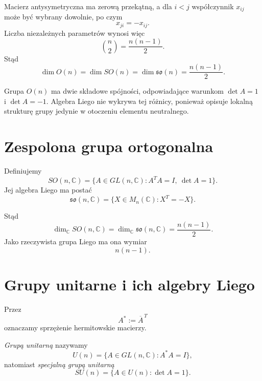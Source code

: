 Macierz antysymetryczna ma zerową przekątną, a dla $i<j$
współczynnik $x_{ij}$ może być wybrany dowolnie, po czym
\[
x_{ji}=-x_{ij}.
\]
Liczba niezależnych parametrów wynosi więc
\[
\binom n2=\frac{n(n-1)}2.
\]
Stąd
\[
\boxed{
\dim O(n)
=
\dim SO(n)
=
\dim\mathfrak{so}(n)
=
\frac{n(n-1)}2.
}
\]

Grupa $O(n)$ ma dwie składowe spójności, odpowiadające warunkom
$\det A=1$ i $\det A=-1$. Algebra Liego nie wykrywa tej różnicy,
ponieważ opisuje lokalną strukturę grupy jedynie w otoczeniu
elementu neutralnego.



\section{Zespolona grupa ortogonalna}


Definiujemy
\[
SO(n,\mathbb C)
=
\{A\in GL(n,\mathbb C):
A^TA=I,\ \det A=1\}.
\]
Jej algebra Liego ma postać
\[
\mathfrak{so}(n,\mathbb C)
=
\{X\in M_n(\mathbb C):X^T=-X\}.
\]

Stąd
\[
\boxed{
\dim_{\mathbb C}SO(n,\mathbb C)
=
\dim_{\mathbb C}\mathfrak{so}(n,\mathbb C)
=
\frac{n(n-1)}2.
}
\]
Jako rzeczywista grupa Liego ma ona wymiar
\[
n(n-1).
\]



\section{Grupy unitarne i ich algebry Liego}
\label{sec:app-grupa-u}


Przez
\[
A^*:=\overline A^{\,T}
\]
oznaczamy sprzężenie hermitowskie macierzy.

\begin{definicja}
\emph{Grupą unitarną} nazywamy
\[
U(n)
=
\{A\in GL(n,\mathbb C):A^*A=I\},
\]
natomiast \emph{specjalną grupą unitarną}
\[
SU(n)
=
\{A\in U(n):\det A=1\}.
\]
\end{definicja}

